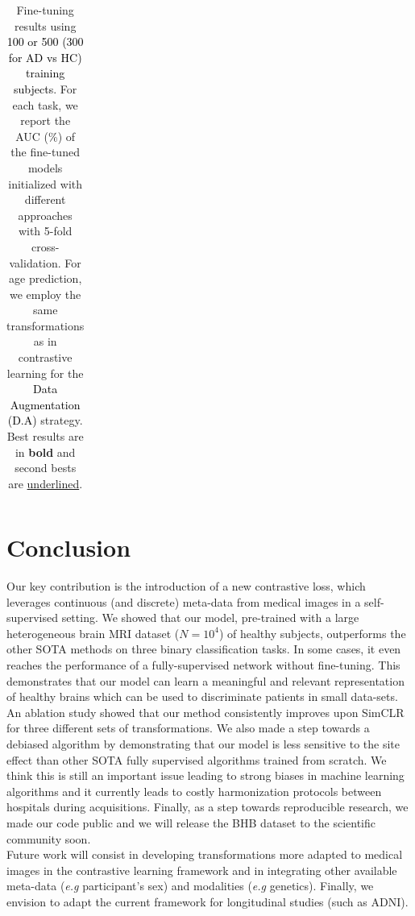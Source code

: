 \documentclass[runningheads]{llncs}
\newcommand{\rebuttal}[1]{\textcolor{black}{#1}}
\begin{document}
\begin{table}[h!]
{\begin{tabular}{c|c|c c|c c|c c}
     \hline
    \end{tabular}
    }
    \caption{Fine-tuning results using \rebuttal{100 or 500 (300 for AD vs HC) training subjects}. For each task, we report the AUC (\%) of the fine-tuned models initialized with different approaches with 5-fold cross-validation. %
    For age prediction, we employ the same transformations as in contrastive learning for the \rebuttal{Data Augmentation (D.A)} strategy. %
    Best results are in \textbf{bold} and second bests are \underline{underlined}.}
    \label{fine-tuning_table}
    \end{table}

\section{Conclusion}

Our key contribution is the introduction of a new contrastive %
loss, which leverages continuous (and discrete) meta-data from medical images in a self-supervised setting. We showed that our model, pre-trained with a large heterogeneous brain MRI dataset ($N=10^4$) of healthy subjects, outperforms the other SOTA methods on three binary classification tasks. In some cases, it even reaches the performance of a fully-supervised network without fine-tuning. This demonstrates that our model can learn a meaningful and relevant representation of healthy brains which can be used to discriminate patients in small data-sets. An ablation study showed that our method consistently improves upon SimCLR for three different sets of transformations. We also made a step towards a debiased algorithm by demonstrating that our model is less sensitive to the site effect than other SOTA fully supervised algorithms trained from scratch. We think this is still an important issue leading to strong biases in machine learning algorithms and it currently leads to costly harmonization protocols between hospitals during acquisitions. Finally, as a step towards reproducible research, we made our code public and we will release the BHB dataset to the scientific community soon.\\
Future work will consist in developing transformations more adapted to medical images in the contrastive learning framework and in integrating other available meta-data (\textit{e.g} participant's sex) and modalities (\textit{e.g} genetics). Finally, we envision to adapt the current framework for longitudinal studies (such as ADNI). \\
\end{document}
